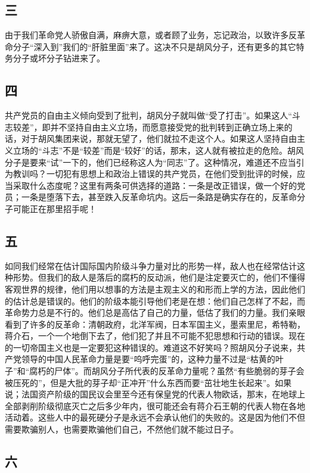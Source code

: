 \subsection*{三}

由于我们革命党人骄傲自满，麻痹大意，或者顾了业务，忘记政治，以致许多反革命分子“深入到”我们的“肝脏里面”来了。这决不只是胡风分子，还有更多的其它特务分子或坏分子钻进来了。

\subsection*{四}

共产党员的自由主义倾向受到了批判，胡风分子就叫做“受了打击”。如果这人“斗志较差”，即并不坚持自由主义立场，而愿意接受党的批判转到正确立场上来的话，对于胡风集团来说，那就无望了，他们就拉不走这个人。如果这人坚持自由主义立场的“斗志”不是“较差”而是“较好”的话，那末，这人就有被拉走的危险。胡风分子是要来“试”一下的，他们已经称这人为“同志”了。这种情况，难道还不应当引为教训吗？一切犯有思想上和政治上错误的共产党员，在他们受到批评的时候，应当采取什么态度呢？这里有两条可供选择的道路：一条是改正错误，做一个好的党员；一条是堕落下去，甚至跌入反革命坑内。这后一条路是确实存在的，反革命分子可能正在那里招手呢！

\subsection*{五}

如同我们经常在估计国际国内阶级斗争力量对比的形势一样，敌人也在经常估计这种形势。但我们的敌人是落后的腐朽的反动派，他们是注定要灭亡的，他们不懂得客观世界的规律，他们用以想事的方法是主观主义的和形而上学的方法，因此他们的估计总是错误的。他们的阶级本能引导他们老是在想：他们自己怎样了不起，而革命势力总是不行的。他们总是高估了自己的力量，低估了我们的力量。我们亲眼看到了许多的反革命：清朝政府，北洋军阀，日本军国主义，墨索里尼，希特勒，蒋介石，一个一个地倒下去了，他们犯了并且不可能不犯思想和行动的错误。现在的一切帝国主义也是一定要犯这种错误的。难道这不好笑吗？照胡风分子说来，共产党领导的中国人民革命力量是要“呜呼完蛋”的，这种力量不过是“枯黄的叶子”和“腐朽的尸体”。而胡风分子所代表的反革命力量呢？虽然“有些脆弱的芽子会被压死的”，但是大批的芽子却“正冲开”什么东西而要“茁壮地生长起来”。如果说；法国资产阶级的国民议会里至今还有保皇党的代表人物欧话，那末，在地球上全部剥削阶级彻底灭亡之后多少年内，很可能还会有蒋介石王朝的代表人物在各地活动着。这些人中的最死硬分子是永远不会承认他们的失败的。这是因为他们不但需要欺骗别人，也需要欺骗他们自己，不然他们就不能过日子。

\subsection*{六}

